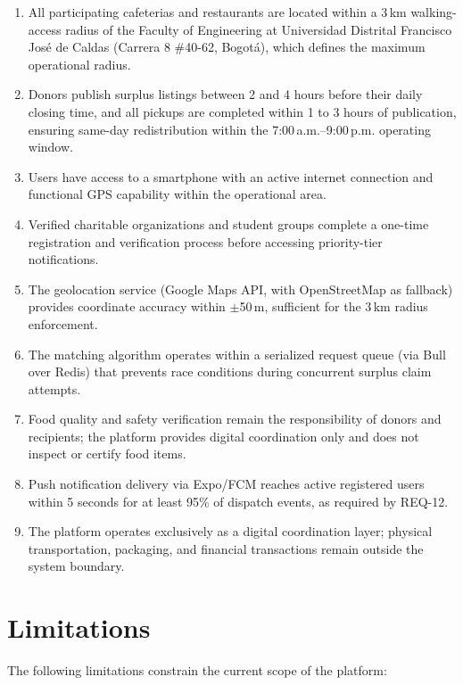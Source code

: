 \documentclass[conference]{IEEEtran}
\begin{document}
\begin{enumerate}
    \item All participating cafeterias and restaurants are located within a 3\,km walking-access radius of the Faculty of Engineering at Universidad Distrital Francisco José de Caldas (Carrera 8 \#40-62, Bogotá), which defines the maximum operational radius.
    \item Donors publish surplus listings between 2 and 4 hours before their daily closing time, and all pickups are completed within 1 to 3 hours of publication, ensuring same-day redistribution within the 7:00\,a.m.--9:00\,p.m. operating window.
    \item Users have access to a smartphone with an active internet connection and functional GPS capability within the operational area.
    \item Verified charitable organizations and student groups complete a one-time registration and verification process before accessing priority-tier notifications.
    \item The geolocation service (Google Maps API, with OpenStreetMap as fallback) provides coordinate accuracy within $\pm$50\,m, sufficient for the 3\,km radius enforcement.
    \item The matching algorithm operates within a serialized request queue (via Bull over Redis) that prevents race conditions during concurrent surplus claim attempts.
    \item Food quality and safety verification remain the responsibility of donors and recipients; the platform provides digital coordination only and does not inspect or certify food items.
    \item Push notification delivery via Expo/FCM reaches active registered users within 5 seconds for at least 95\% of dispatch events, as required by REQ-12.
    \item The platform operates exclusively as a digital coordination layer; physical transportation, packaging, and financial transactions remain outside the system boundary.
\end{enumerate}

\section{Limitations}

The following limitations constrain the current scope of the platform:
\end{document}
